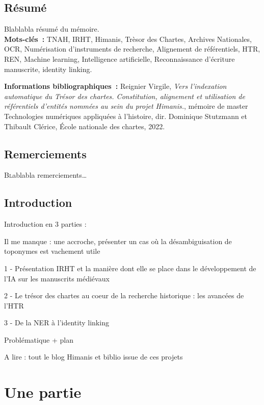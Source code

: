 \documentclass[a4paper,12pt,twoside]{book}
\begin{document}
	\chapter{Résumé}
	\medskip
	Blablabla résumé du mémoire.\\
	
	\textbf{Mots-clés~:} TNAH, IRHT, Himanis, Trèsor des Chartes, Archives Nationales, OCR, Numérisation d'instruments de recherche, Alignement de référentiels, HTR, REN, Machine learning, Intelligence artificielle, Reconnaissance d'écriture manuscrite, identity linking.
	
	\textbf{Informations bibliographiques~:} Reignier Virgile, \textit{Vers l’indexation automatique du Trésor des chartes. Constitution, alignement et utilisation de référentiels d’entités nommées au sein du projet Himanis.}, mémoire de master \og{}Technologies numériques appliquées à l'histoire\fg{}, dir. Dominique Stutzmann et Thibault Clérice, École nationale des chartes, 2022.
	
	\chapter{Remerciements}
	
	\lettrine{B}lablabla remerciements\dots
	
	
	\chapter{Introduction}
	
	Introduction en 3 parties :
	
	Il me manque : une accroche, présenter un cas où la désambiguisation de toponymes est vachement utile
	
	1 - Présentation IRHT et la manière dont elle se place dans le développement de l'IA sur les manuscrits médiévaux
	
	2 - Le trésor des chartes au coeur de la recherche historique : les avancées de l'HTR
	
	3 - De la NER à l'identity linking
	
	Problématique + plan
	
	A lire : tout le blog Himanis et biblio issue de ces projets
	
	
	\thispagestyle{empty}
	\cleardoublepage
	
	\mainmatter
	
	\part{Une partie}
	
\end{document}
